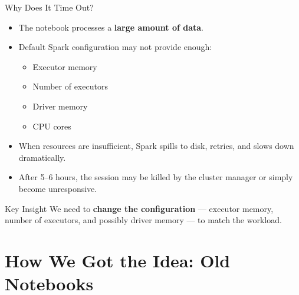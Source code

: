 \documentclass[aspectratio=169]{beamer}
\begin{document}
	\begin{frame}{Why Does It Time Out?}
		\begin{itemize}
			\item The notebook processes a \textbf{large amount of data}.
			\item Default Spark configuration may not provide enough:
			\begin{itemize}
				\item Executor memory
				\item Number of executors
				\item Driver memory
				\item CPU cores
			\end{itemize}
			\item When resources are insufficient, Spark spills to disk, retries, and slows down dramatically.
			\item After 5--6 hours, the session may be killed by the cluster manager or simply become unresponsive.
		\end{itemize}
		
		\begin{exampleblock}{Key Insight}
			We need to \textbf{change the configuration} --- executor memory, number of executors, and possibly driver memory --- to match the workload.
		\end{exampleblock}
	\end{frame}
	
	\section{How We Got the Idea: Old Notebooks}
	
\end{document}
